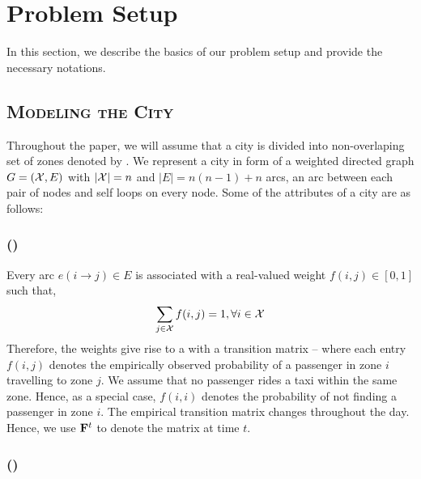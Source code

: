 
\section{Problem Setup}
\label{sec:problem_setup}

In this section, we describe the basics of our problem setup and provide the necessary notations.



\subsection{\textsc{Modeling the City}}

Throughout the paper, we will assume that a city is divided into non-overlaping set of zones denoted by \cityzones. 
We represent a city in form of a weighted directed graph $G=(\mathcal{X}, E)$ with 
$|\mathcal{X}| = n$ and $|E| = n(n-1) + n$ arcs, an arc between each pair of nodes and self loops on every node. 
Some of the attributes of a city are as follows:

\subsubsection{ (\empiricaltransitionmatrix)}

Every arc $e(i\rightarrow j) \in E$ is associated with a real-valued weight $f(i,j) \in [0,1]$ such that,
\begin{equation}
	\sum_{j \in \mathcal{X}} f(i,j) = 1, \forall i \in \mathcal{X}
\end{equation}
Therefore, the weights give rise to a {\markovchain} with a transition matrix {\empiricaltransitionmatrix} -- 
where each entry $f(i,j)$ 
denotes the empirically observed probability of a passenger in zone $i$
travelling to zone $j$. We assume that no passenger rides a taxi within the same zone. Hence, as a special case, 
$f(i,i)$ denotes the probability of not finding a passenger in zone $i$. The empirical transition matrix {\empiricaltransitionmatrix}
changes throughout the day. Hence, we use ${\mathbf{F}}^t$ to denote the matrix at time $t$.

\subsubsection{ (\traveltimematrix)}

